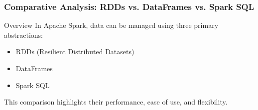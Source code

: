 \documentclass[aspectratio=169]{beamer}
\begin{document}
\begin{frame}
    \frametitle{Comparative Analysis: RDDs vs. DataFrames vs. Spark SQL}
    
    \begin{block}{Overview}
        In Apache Spark, data can be managed using three primary abstractions: 

        \begin{itemize}
            \item RDDs (Resilient Distributed Datasets)
            \item DataFrames
            \item Spark SQL
        \end{itemize}
        
        This comparison highlights their performance, ease of use, and flexibility.
    \end{block}
\end{frame}
\end{document}
